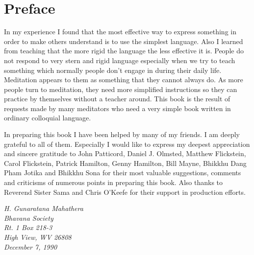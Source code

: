 \chapter{Preface}
In my experience I found that the most effective way to express something in
order to make others understand is to use the simplest language. Also I learned
from teaching that the more rigid the language the less effective it is. People
do not respond to very stern and rigid language especially when we try to teach
something which normally people don't engage in during their daily life.
Meditation appears to them as something that they cannot always do. As more
people turn to meditation, they need more simplified instructions so they can
practice by themselves without a teacher around. This book is the result of
requests made by many meditators who need a very simple book written in ordinary
colloquial language.

In preparing this book I have been helped by many of my friends. I am deeply
grateful to all of them. Especially I would like to express my deepest
appreciation and sincere gratitude to John Patticord, Daniel J. Olmsted, Matthew
Flickstein, Carol Flickstein, Patrick Hamilton, Genny Hamilton, Bill Mayne,
Bhikkhu Dang Pham Jotika and Bhikkhu Sona for their most valuable suggestions,
comments and criticisms of numerous points in preparing this book. Also thanks
to Reverend Sister Sama and Chris O'Keefe for their support in production
efforts.

    
\begin{flushright}
    \raggedleft
    \itshape
    \small
    H. Gunaratana Mahathera\\
    Bhavana Society\\
    Rt. 1 Box 218-3\\
    High View, WV 26808\\
    December 7, 1990\\
    
\end{flushright}